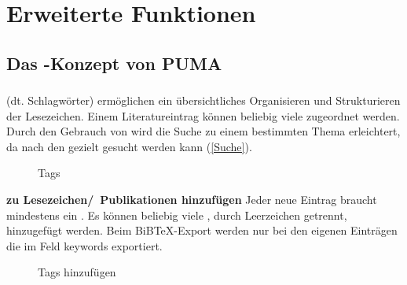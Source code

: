 \chapter{Erweiterte Funktionen}
\section{Das \tag-Konzept von PUMA}

\subsection{\tags}
\label{subsec:tags}
\tags{} (dt. Schlagwörter) ermöglichen ein übersichtliches Organisieren und Strukturieren der Lesezeichen. Einem Literatureintrag können beliebig viele \tags zugeordnet werden. Durch den Gebrauch von \tags wird die Suche zu einem bestimmten Thema erleichtert, da nach den \tags gezielt gesucht werden kann (\autoref{Suche}). \\
\begin{figure}[h!]
 \centering
 \caption{Tags}
 \label{figure025}
\end{figure}
\textbf{\tags zu Lesezeichen/~Publikationen hinzufügen}\newline
Jeder neue Eintrag braucht mindestens ein \tag. Es können beliebig viele \tags, durch Leerzeichen getrennt, hinzugefügt werden. Beim BiBTeX-Export werden nur bei den eigenen Einträgen die \tags im Feld keywords exportiert.\\
\begin{figure}[h!]
 \centering
 \caption{Tags hinzufügen}
 \label{figure026}
\end{figure} 
